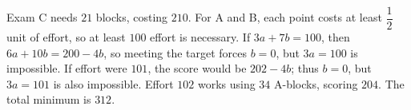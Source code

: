 Exam C needs $21$ blocks, costing $210$. For A and B, each point costs at least $\dfrac{1}{2}$ unit of effort, so at least $100$ effort is necessary. If $3a+7b=100$, then $6a+10b=200-4b$, so meeting the target forces $b=0$, but $3a=100$ is impossible. If effort were $101$, the score would be $202-4b$; thus $b=0$, but $3a=101$ is also impossible. Effort $102$ works using $34$ A-blocks, scoring $204$. The total minimum is $\boxed{312}$.
